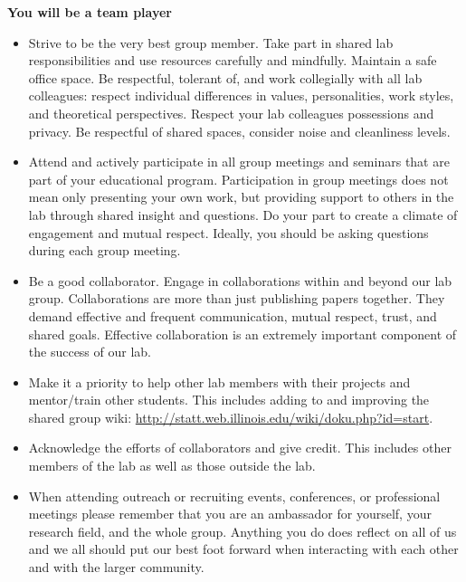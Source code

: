 \documentclass{article}
\begin{document}
\textbf{You will be a team player}
\begin{itemize}
		\item Strive to be the very best group member. Take part in shared lab responsibilities and use 
	resources carefully and mindfully. Maintain a safe office space. Be respectful, tolerant of, and work collegially	with all lab colleagues: respect individual differences in values, personalities, work styles,
	and theoretical perspectives. Respect your lab colleagues possessions and privacy. Be respectful of shared spaces, consider noise and cleanliness levels.
	\item Attend and actively participate in all group meetings and seminars that are part of your
	educational program. Participation in group meetings does not mean only presenting your own
	work, but providing support to others in the lab through shared insight and questions. Do your part to create a climate of engagement and mutual respect. Ideally, you should be asking questions during each group meeting.
	\item Be a good collaborator. Engage in collaborations within and beyond our lab group. Collaborations
	are more than just publishing papers together. They demand effective and frequent communication,
	mutual respect, trust, and shared goals. Effective collaboration is an extremely important
	component of the success of our lab.
	\item  Make it a priority to help other lab members with their projects and mentor/train other students. This includes adding to and improving the shared group wiki: \href{http://statt.web.illinois.edu/wiki/doku.php?id=start}{http://statt.web.illinois.edu/wiki/doku.php?id=start}.
   \item Acknowledge the efforts of collaborators and give credit. This includes other members of the lab as well as
those outside the lab.
\item When attending outreach or recruiting events, conferences, or professional meetings please remember that you are an ambassador for yourself, your research field, and the whole group. Anything you do does reflect on all of us and we all should put our best foot forward when interacting with each other and with the larger community.
\end{itemize}
\end{document}
